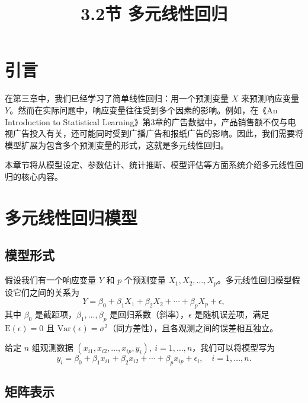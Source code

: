 \documentclass[UTF8]{ctexart}
\title{3.2节 多元线性回归}
\date{}
\numberwithin{equation}{section}
\begin{document}
\maketitle

\section{引言}

在第三章中，我们已经学习了简单线性回归：用一个预测变量 \(X\) 来预测响应变量 \(Y\)。然而在实际问题中，响应变量往往受到多个因素的影响。例如，在《An Introduction to Statistical Learning》第3章的广告数据中，产品销售额不仅与电视广告投入有关，还可能同时受到广播广告和报纸广告的影响。因此，我们需要将模型扩展为包含多个预测变量的形式，这就是多元线性回归。

本章节将从模型设定、参数估计、统计推断、模型评估等方面系统介绍多元线性回归的核心内容。

\section{多元线性回归模型}

\subsection{模型形式}

假设我们有一个响应变量 \(Y\) 和 \(p\) 个预测变量 \(X_1, X_2, \ldots, X_p\)。多元线性回归模型假设它们之间的关系为
\begin{equation}
Y = \beta_0 + \beta_1 X_1 + \beta_2 X_2 + \cdots + \beta_p X_p + \epsilon,
\label{eq:model}
\end{equation}
其中 \(\beta_0\) 是截距项，\(\beta_1,\ldots,\beta_p\) 是回归系数（斜率），\(\epsilon\) 是随机误差项，满足 \(\mathrm{E}(\epsilon)=0\) 且 \(\mathrm{Var}(\epsilon)=\sigma^2\)（同方差性），且各观测之间的误差相互独立。

给定 \(n\) 组观测数据 \((x_{i1},x_{i2},\ldots,x_{ip},y_i),\ i=1,\ldots,n\)，我们可以将模型写为
\begin{equation}
y_i = \beta_0 + \beta_1 x_{i1} + \beta_2 x_{i2} + \cdots + \beta_p x_{ip} + \epsilon_i,\quad i=1,\ldots,n.
\label{eq:obs}
\end{equation}

\subsection{矩阵表示}
\end{document}
